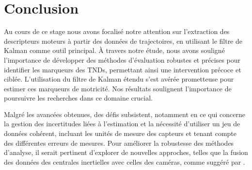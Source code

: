 \documentclass[8pt]{article}
\begin{document}
\section{Conclusion}
Au cours de ce stage nous avons  focalisé notre attention sur l'extraction des descripteurs moteurs à partir des données de trajectoires, en utilisant le filtre de Kalman comme outil principal. À travers notre étude, nous avons souligné l'importance de développer des méthodes d'évaluation robustes et précises pour identifier les marqueurs des TNDs, permettant ainsi une intervention précoce et ciblée. L'utilisation du filtre de Kalman étendu s'est avérée prometteuse pour estimer ces marqueurs de motricité. Nos résultats soulignent l'importance de poursuivre les recherches dans ce domaine crucial. 

Malgré les avancées obtenues, des défis subsistent, notamment en ce qui concerne la gestion des incertitudes liées à l'estimation et la nécessité d'utiliser un jeu de données cohérent, incluant les unités de mesure des capteurs et tenant compte des différentes erreurs de mesures. Pour améliorer la robustesse des méthodes d'analyse, il serait pertinent d'explorer de nouvelles approches, telles que la fusion des données des centrales inertielles avec celles des caméras, comme suggéré par \textcite{ouss_developmental_2018}.
\newpage
\printbibliography
\newpage
\end{document}
